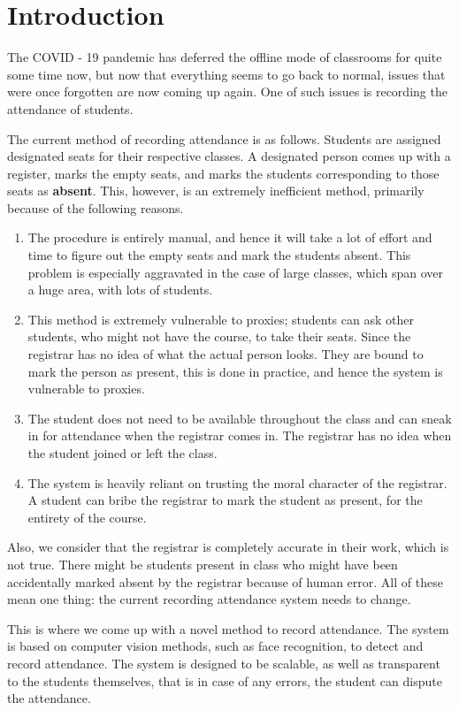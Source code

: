 \documentclass[conference]{IEEEtran}
\begin{document}
\section{Introduction}
The COVID - 19 pandemic has deferred the offline mode of classrooms for quite some time now, but now that everything seems to go back to normal, issues that were once forgotten are now coming up again. One of such issues is recording the attendance of students.
\par 
The current method of recording attendance is as follows. Students are assigned designated seats for their respective classes. A designated person comes up with a register, marks the empty seats, and marks the 
students corresponding to those seats as \textbf{absent}. This, however, is an extremely inefficient method, primarily because of the following reasons.
\begin{enumerate}
    \item The procedure is entirely manual, and hence it will take a lot of effort and time to figure out the empty seats and mark the students absent. This problem is especially aggravated in the case of large classes, which span over a huge area, with lots of students.
    \item This method is extremely vulnerable to proxies; students can ask other students, who might not have the course, to take their seats. Since the registrar has no idea of what the actual person looks. They are bound to mark the person as present, this is done in practice, and hence the system is vulnerable to proxies.
    \item The student does not need to be available throughout the class and can sneak in for attendance when the registrar comes in. The registrar has no idea when the student joined or left the class.
    \item The system is heavily reliant on trusting the moral character of the registrar. A student can bribe the registrar to mark the student as present, for the entirety of the course.
\end{enumerate}
Also, we consider that the registrar is completely accurate in their work, which is not true. There might be students present in class who might have been accidentally 
marked absent by the registrar because of human error. All of these mean one thing: the current recording attendance system needs to change.
\par
This is where we come up with a novel method to record attendance. The system is based on computer vision methods, such as face recognition, to detect and record attendance. The system is designed to be scalable, as well as transparent to the students themselves, that is in case of any errors, the student can dispute the attendance.
\end{document}

